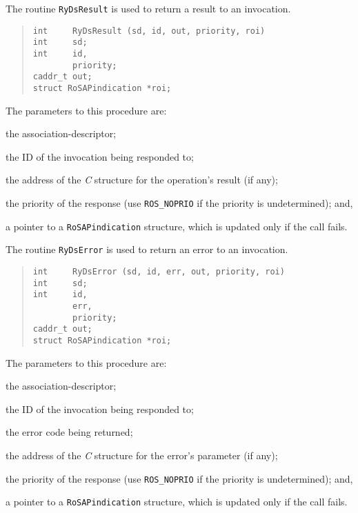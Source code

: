 The routine \verb"RyDsResult" is used to return a result to an invocation.
\begin{quote}\small\begin{verbatim}
int     RyDsResult (sd, id, out, priority, roi)
int     sd;
int     id,
        priority;
caddr_t out;
struct RoSAPindication *roi;
\end{verbatim}\end{quote}
The parameters to this procedure are:
\begin{describe}
\item[\verb"sd":] the association-descriptor;

\item[\verb"id":] the ID of the invocation being responded to;

\item[\verb"out":] the address of the {\em C\/} structure for the operation's
result (if any);

\item[\verb"priority":] the priority of the response
(use \verb"ROS_NOPRIO" if the priority is undetermined);
and,

\item[\verb"roi":] a pointer to a \verb"RoSAPindication" structure,
which is updated only if the call fails.
\end{describe}

The routine \verb"RyDsError" is used to return an error to an invocation.
\begin{quote}\small\begin{verbatim}
int     RyDsError (sd, id, err, out, priority, roi)
int     sd;
int     id,
        err,
        priority;
caddr_t out;
struct RoSAPindication *roi;
\end{verbatim}\end{quote}
The parameters to this procedure are:
\begin{describe}
\item[\verb"sd":] the association-descriptor;

\item[\verb"id":] the ID of the invocation being responded to;

\item[\verb"err":] the error code being returned;

\item[\verb"out":] the address of the {\em C\/} structure for the error's
parameter (if any);

\item[\verb"priority":] the priority of the response
(use \verb"ROS_NOPRIO" if the priority is undetermined);
and,

\item[\verb"roi":] a pointer to a \verb"RoSAPindication" structure,
which is updated only if the call fails.
\end{describe}


